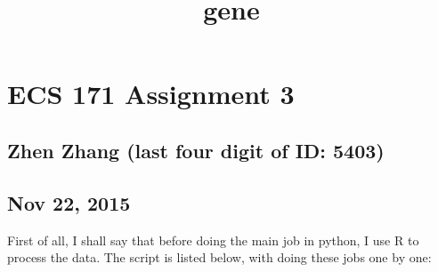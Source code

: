 \documentclass{article}
\title{gene}
\begin{document}
    
    
    \maketitle
    
    

    
    \section{ECS 171 Assignment 3}\label{ecs-171-assignment-3}

\subsection{Zhen Zhang (last four digit of ID:
5403)}\label{zhen-zhang-last-four-digit-of-id-5403}

\subsection{Nov 22, 2015}\label{nov-22-2015}

    First of all, I shall say that before doing the main job in python, I
use R to process the data. The script is listed below, with doing these
jobs one by one:
\end{document}
